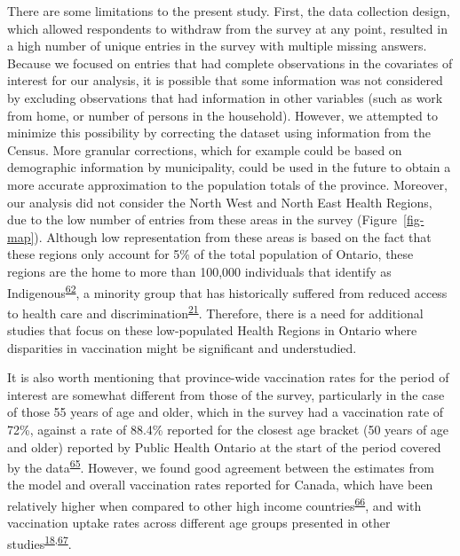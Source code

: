 \documentclass[
  letterpaper,
  DIV=11,
  numbers=noendperiod]{scrartcl}
\begin{document}
There are some limitations to the present study. First, the data
collection design, which allowed respondents to withdraw from the survey
at any point, resulted in a high number of unique entries in the survey
with multiple missing answers. Because we focused on entries that had
complete observations in the covariates of interest for our analysis, it
is possible that some information was not considered by excluding
observations that had information in other variables (such as work from
home, or number of persons in the household). However, we attempted to
minimize this possibility by correcting the dataset using information
from the Census. More granular corrections, which for example could be
based on demographic information by municipality, could be used in the
future to obtain a more accurate approximation to the population totals
of the province. Moreover, our analysis did not consider the North West
and North East Health Regions, due to the low number of entries from
these areas in the survey (Figure~\ref{fig-map}). Although low
representation from these areas is based on the fact that these regions
only account for 5\% of the total population of Ontario, these regions
are the home to more than 100,000 individuals that identify as
Indigenous\textsuperscript{\protect\hyperlink{ref-ontariohealth}{62}}, a
minority group that has historically suffered from reduced access to
health care and
discrimination\textsuperscript{\protect\hyperlink{ref-mosby2021}{21}}.
Therefore, there is a need for additional studies that focus on these
low-populated Health Regions in Ontario where disparities in vaccination
might be significant and understudied.

It is also worth mentioning that province-wide vaccination rates for the
period of interest are somewhat different from those of the survey,
particularly in the case of those 55 years of age and older, which in
the survey had a vaccination rate of 72\%, against a rate of 88.4\%
reported for the closest age bracket (50 years of age and older)
reported by Public Health Ontario at the start of the period covered by
the data\textsuperscript{\protect\hyperlink{ref-ontario-covid}{65}}.
However, we found good agreement between the estimates from the model
and overall vaccination rates reported for Canada, which have been
relatively higher when compared to other high income
countries\textsuperscript{\protect\hyperlink{ref-dube2022}{66}}, and
with vaccination uptake rates across different age groups presented in
other
studies\textsuperscript{\protect\hyperlink{ref-guay2022}{18},\protect\hyperlink{ref-macdonald2021}{67}}.
\end{document}
